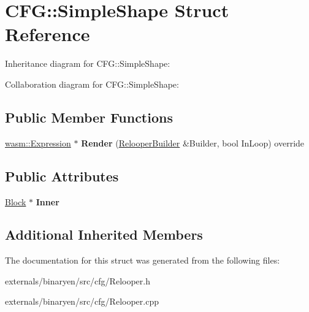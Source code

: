 \hypertarget{struct_c_f_g_1_1_simple_shape}{}\section{C\+FG\+:\+:Simple\+Shape Struct Reference}
\label{struct_c_f_g_1_1_simple_shape}


Inheritance diagram for C\+FG\+:\+:Simple\+Shape\+:


Collaboration diagram for C\+FG\+:\+:Simple\+Shape\+:
\subsection*{Public Member Functions}
\begin{DoxyCompactItemize}
\item 
\mbox{\label{struct_c_f_g_1_1_simple_shape_a3162ba01c4cdee32eeb94ffebb5837ad}} 
\mbox{\hyperlink{classwasm_1_1_expression}{wasm\+::\+Expression}} $\ast$ {\bfseries Render} (\mbox{\hyperlink{class_c_f_g_1_1_relooper_builder}{Relooper\+Builder}} \&Builder, bool In\+Loop) override
\end{DoxyCompactItemize}
\subsection*{Public Attributes}
\begin{DoxyCompactItemize}
\item 
\mbox{\label{struct_c_f_g_1_1_simple_shape_a443749d2abd0c496ae6eceb753f61090}} 
\mbox{\hyperlink{struct_c_f_g_1_1_block}{Block}} $\ast$ {\bfseries Inner}
\end{DoxyCompactItemize}
\subsection*{Additional Inherited Members}


The documentation for this struct was generated from the following files\+:\begin{DoxyCompactItemize}
\item 
externals/binaryen/src/cfg/Relooper.\+h\item 
externals/binaryen/src/cfg/Relooper.\+cpp\end{DoxyCompactItemize}
